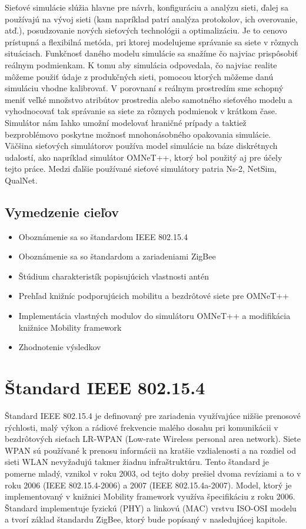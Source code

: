 \documentclass[11pt,twoside,a4paper]{book}
\begin{document}
Sieťové simulácie slúžia hlavne pre návrh, konfiguráciu a analýzu sieti, ďalej sa používajú na vývoj sieti (kam napríklad patrí analýza protokolov, ich overovanie, atď.), posudzovanie nových sieťových technológii a optimalizáciu. Je to cenovo prístupná a flexibilná metóda, pri ktorej modelujeme správanie sa siete v rôznych situáciach. Funkčnosť daného modelu simulácie sa snažíme čo najviac prispôsobiť reálnym podmienkam. K tomu aby simulácia odpovedala, čo najviac realite môžeme použiť údaje z produkčných sieti, pomocou ktorých môžeme danú simuláciu vhodne kalibrovať. V porovnaní s reálnym prostredím sme schopný meniť veľké množstvo atribútov prostredia alebo samotného sieťového modelu a vyhodnocovať tak správanie sa siete za rôznych podmienok v krátkom čase. Simulátor nám ľahko umožní modelovať hraničné prípady a taktiež bezproblémovo poskytne možnosť mnohonásobného opakovania simulácie. Väčšina sieťových simulátorov používa model simulácie na báze diskrétnych udalostí, ako napríklad simulátor OMNeT++, ktorý bol použitý aj pre účely tejto práce. Medzi ďalšie používané sieťové simulátory patria Ns-2, NetSim, QualNet.

\section{Vymedzenie cieľov}
\begin{itemize}
\item Oboznámenie sa so štandardom IEEE 802.15.4
\item Oboznámenie sa so štandardom a zariadeniami ZigBee
\item Štúdium charakteristík popisujúcich vlastnosti antén
\item Prehľad knižníc podporujúcich mobilitu a bezdrôtové siete pre OMNeT++
\item Implementácia vlastných modulov do simulátoru OMNeT++ a modifikácia knižnice Mobility framework
\item Zhodnotenie výsledkov
\end{itemize}


\chapter{Štandard IEEE 802.15.4\texttrademark}

Štandard IEEE 802.15.4 je definovaný pre zariadenia využívajúce nižšie prenosové rýchlosti, malý výkon a rádiové frekvencie malého dosahu pri komunikácii v bezdrôtových sieťach LR-WPAN (Low-rate Wireless personal area network). Siete WPAN sú používané k prenosu informácii na kratšie vzdialenosti a na rozdiel od sieti WLAN nevyžadujú takmer žiadnu infraštruktúru.  Tento štandard je pomerne mladý, vznikol v roku 2003, od tejto doby prešiel dvoma revíziami a to v roku 2006 (IEEE 802.15.4-2006) a 2007 (IEEE 802.15.4a-2007). Model, ktorý je implementovaný v knižnici Mobility framework využíva špecifikáciu z roku 2006. Štandard implementuje fyzickú (PHY) a linkovú (MAC) vrstvu ISO-OSI modelu a tvorí základ štandardu ZigBee, ktorý bude popísaný v nasledujúcej kapitole.
\end{document}
